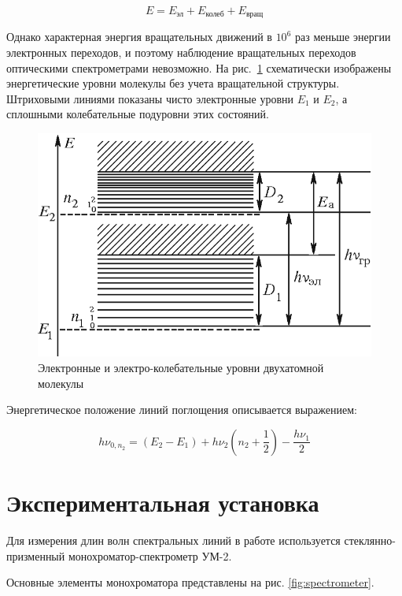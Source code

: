 \documentclass[reprint, nofootinbib, 10pt]{revtex4-2}
\begin{document}
\begin{equation}
	E = E_{\text{эл}} + E_{\text{колеб}} + E_{\text{вращ}}
\end{equation}

Однако характерная энергия вращательных движений в $10^6$ раз меньше энергии электронных переходов,
и поэтому наблюдение вращательных переходов оптическими спектрометрами невозможно.
На рис.~\ref{fig:enrglvls} схематически изображены энергетические уровни молекулы без учета вращательной
структуры. Штриховыми линиями показаны чисто электронные уровни $E_1$ и $E_2$, а сплошными колебательные
подуровни этих состояний.

\begin{figure}[ht]
	\includegraphics[width=\linewidth]{energy_levels.png}
	\caption{Электронные и электро-колебательные уровни двухатомной молекулы}
	\label{fig:enrglvls}
\end{figure}

Энергетическое положение линий поглощения описывается выражением:

\begin{equation}
	\label{eq:molecule_energy}
	h \nu_{0, n_2} = (E_2 - E_1) + h \nu_2 \left( n_2 + \frac{1}{2} \right) - \frac{h \nu_1}{2}
\end{equation}


\section*{Экспериментальная установка}

Для измерения длин волн спектральных линий в работе используется стеклянно-призменный
монохроматор-спектрометр УМ-2.

Основные элементы монохроматора представлены на рис. \ref{fig:spectrometer}.
\end{document}
